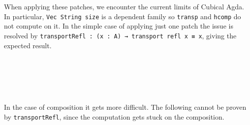 When applying these patches, we encounter the current limits of Cubical Agda.
In particular, \texttt{Vec String size} is a dependent family so \texttt{transp} and
\texttt{hcomp} do not compute on it. In the simple case of applying just one patch the issue
is resolved by \texttt{transportRefl : (x : A) → transport refl x ≡ x}, giving the expected result.
\begin{code}%
%
\>[2]\AgdaFunction{\AgdaUnderscore{}}\AgdaSpace{}%
\AgdaSymbol{:}\AgdaSpace{}%
\AgdaSpace{}%
\AgdaSpace{}%
\AgdaSpace{}%
\AgdaSpace{}%
\<%
\\
%
\>[2]\AgdaSymbol{\AgdaUnderscore{}}\AgdaSpace{}%
\AgdaSymbol{=}\AgdaSpace{}%
\AgdaSpace{}%
\<%
\\
%
\\[\AgdaEmptyExtraSkip]%
%
\>[2]\AgdaFunction{\AgdaUnderscore{}}\AgdaSpace{}%
\AgdaSymbol{:}\AgdaSpace{}%
\AgdaSpace{}%
\AgdaSpace{}%
\AgdaSpace{}%
\AgdaSpace{}%
\AgdaSpace{}%
\AgdaSpace{}%
\AgdaSpace{}%
\AgdaSpace{}%
\AgdaInductiveConstructor{[]}\<%
\\
%
\>[2]\AgdaSymbol{\AgdaUnderscore{}}\AgdaSpace{}%
\AgdaSymbol{=}\AgdaSpace{}%
\AgdaSpace{}%
\AgdaSymbol{\AgdaUnderscore{}}\<%
\end{code}

In the case of composition it gets more difficult. The following cannot be proven by
\texttt{transportRefl}, since the computation gets stuck on the composition.
\begin{code}%
%
\>[2]\AgdaFunction{\AgdaUnderscore{}}\AgdaSpace{}%
\AgdaSymbol{:}\AgdaSpace{}%
\AgdaSpace{}%
\AgdaSpace{}%
\AgdaSpace{}%
\AgdaSpace{}%
\AgdaSpace{}%
\AgdaSpace{}%
\AgdaSpace{}%
\AgdaSpace{}%
\AgdaInductiveConstructor{[]}\<%
\\
%
\>[2]\AgdaSymbol{\AgdaUnderscore{}}\AgdaSpace{}%
\AgdaSymbol{=}\AgdaSpace{}%
\AgdaHole{\{!!\}}\<%
\end{code}

